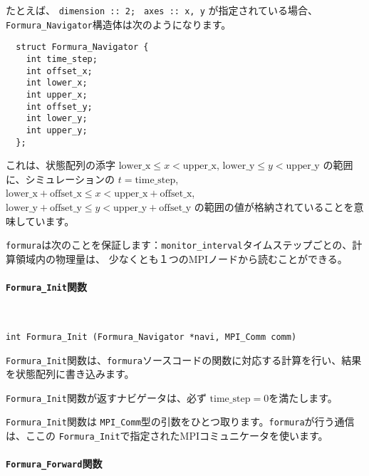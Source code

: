 \documentclass{jsarticle}
\newcommand{\formura}{{\texttt{formura}}}
\begin{document}
たとえば、
\verb`dimension :: 2; `
\verb`axes :: x, y`
が指定されている場合、
\verb`Formura_Navigator`構造体は次のようになります。

\begin{screen}
\begin{verbatim}
  struct Formura_Navigator {
    int time_step;
    int offset_x;
    int lower_x;
    int upper_x;
    int offset_y;
    int lower_y;
    int upper_y;
  };
\end{verbatim}
\end{screen}

これは、状態配列の添字
$\mathrm{lower\_x} \leq x < \mathrm{upper\_x}$,
$\mathrm{lower\_y} \leq y < \mathrm{upper\_y}$
の範囲に、シミュレーションの
$t = \mathrm{time\_step}$,
$\mathrm{lower\_x} + \mathrm{offset\_x} \leq x < \mathrm{upper\_x} + \mathrm{offset\_x}$,
$\mathrm{lower\_y} + \mathrm{offset\_y} \leq y < \mathrm{upper\_y} + \mathrm{offset\_y}$
の範囲の値が格納されていることを意味しています。



\formura は次のことを保証します：\verb`monitor_interval`タイムステップごとの、計算領域内の物理量は、
少なくとも１つのMPIノードから読むことができる。


\paragraph{\texttt{Formura\_Init}関数} \leavevmode\\

\begin{screen}
\begin{verbatim}
int Formura_Init (Formura_Navigator *navi, MPI_Comm comm)
\end{verbatim}
\end{screen}
\verb`Formura_Init`関数は、\formura ソースコードの関数に対応する計算を行い、結果を状態配列に書き込みます。

\verb`Formura_Init`関数が返すナビゲータは、必ず
$\mathrm{time\_step} = 0$を満たします。


\verb`Formura_Init`関数は
\verb`MPI_Comm`型の引数をひとつ取ります。\formura が行う通信は、ここの
\verb`Formura_Init`で指定されたMPIコミュニケータを使います。


\paragraph{\texttt{Formura\_Forward}関数} \leavevmode\\
\end{document}
